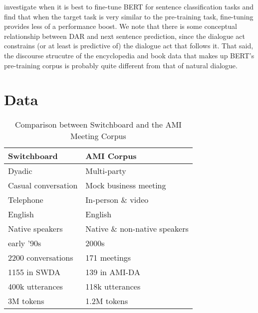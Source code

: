 \documentclass[11pt,a4paper]{article}
\begin{document}
\citet{petersTuneNotTune2019} investigate when it is best to fine-tune BERT for sentence classification tasks 
and find that when the target task is very similar to the pre-training task, 
fine-tuning provides less of a performance boost.
We note that there is some conceptual relationship between DAR and next sentence prediction, since the dialogue act constrains (or at least is predictive of) the dialogue act that follows it.
That said, the discourse strucutre of the encyclopedia and book data that makes up BERT's pre-training corpus
is probably quite different from that of natural dialogue.


\section{Data}\label{sec:data}

\begin{table}[]
\centering
\begin{tabular}{@{}ll@{}}
\toprule
\textbf{Switchboard}       & \textbf{AMI Corpus}                     \\ \midrule
Dyadic                     & Multi-party                             \\
Casual conversation        & Mock business meeting                   \\
Telephone                  & In-person \& video                      \\ \midrule
English                    & English                                 \\ 
Native speakers            & Native \& non-native speakers           \\ 
early '90s                 & 2000s                                   \\ \midrule
2200 conversations         & 171 meetings                            \\
  \hspace{1em} 1155 in SWDA               & \hspace{1em} 139 in AMI-DA                           \\
400k utterances             & 118k utterances                         \\
3M tokens                  & 1.2M tokens                             \\ \bottomrule
\end{tabular}
  \caption{Comparison between Switchboard and the AMI Meeting Corpus}
  \label{tab:corpora}
\end{table}
\end{document}
